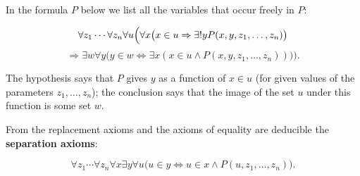 In the formula $P$ below we list all the variables that occur freely in $P$:

$$\forall z_1 \cdots \forall z_n \forall u \Bigl(\forall x \bigl(x \in u \Rightarrow \exists!y P(x, y, z_1, \ldots, z_n)\bigr)$$
$$\Rightarrow \exists w \forall y \bigl(y \in w \Leftrightarrow \exists x (x \in u \wedge P(x, y, z_1, \ldots, z_n))\bigr)\Bigr).$$

The hypothesis says that $P$ gives $y$ as a function of $x \in u$ (for given values of the parameters $z_1, \ldots, z_n$); the conclusion says that the image of the set $u$ under this function is some set $w$.

From the replacement axioms and the axioms of equality are deducible the \textbf{separation axioms}:

$$\forall z_1 \cdots \forall z_n \forall x \exists y \forall u \bigl(u \in y \Leftrightarrow u \in x \wedge P(u, z_1, \ldots, z_n)\bigr).$$
